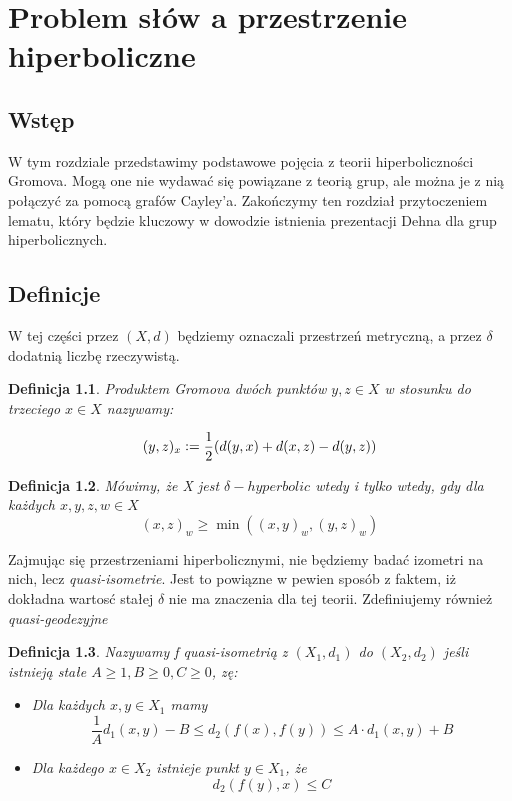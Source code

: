 \documentclass[licencjacka]{pracamgr}
\newcommand{\defeq}{\vcentcolon=}
\newtheorem{defi}{Definicja}[section]
\begin{document}
\chapter{Problem słów a przestrzenie hiperboliczne}\label{hyperbolicity}

\section{Wstęp}

W tym rozdziale przedstawimy podstawowe pojęcia z teorii hiperboliczności Gromova. Mogą one nie wydawać się powiązane z teorią grup, ale można je z nią połączyć za pomocą grafów Cayley'a. Zakończymy ten rozdział przytoczeniem lematu, który będzie kluczowy w dowodzie istnienia prezentacji Dehna dla grup hiperbolicznych.

\section{Definicje}

W tej części przez $(X, d)$ będziemy oznaczali przestrzeń metryczną, a przez $\delta$ dodatnią liczbę rzeczywistą.

\begin{defi}\label{Gromov product}
Produktem Gromova dwóch punktów $y, z \in X$ w stosunku do trzeciego $x \in X$ nazywamy:

\[ (y,z)_{x} \defeq \frac{1}{2} (d(y, x) + d(x, z) - d(y, z)) \]
\end{defi}

\begin{defi}\label{Hyperbolic space}
Mówimy, że X jest $\delta-hyperbolic$ wtedy i tylko wtedy, gdy dla każdych $x, y, z, w \in X$
\[ (x,z)_{w} \geq \min((x,y)_{w}, (y, z)_{w}) \]
\end{defi}

Zajmując się przestrzeniami hiperbolicznymi, nie będziemy badać izometri na nich, lecz \textit{quasi-isometrie}. Jest to powiązne w pewien sposób z faktem, iż dokładna wartosć stałej $\delta$ nie ma znaczenia dla tej teorii. Zdefiniujemy również \textit{quasi-geodezyjne}

\begin{defi}\label{Quasi-isometries}
Nazywamy f \emph{quasi-isometrią} z $(X_{1}, d_{1})$ do $(X_{2}, d_{2})$ jeśli istnieją stałe $A \geq 1, B \geq 0, C \geq 0$, zę:

\begin{itemize}
\item Dla każdych $x, y \in X_{1}$ mamy
\[ \frac{1}{A} d_{1}(x, y) - B \leq d_{2}(f(x), f(y)) \leq A \cdot d_{1}(x, y) + B \]
\item Dla każdego $x \in X_{2}$ istnieje punkt $y \in X_{1}$, że
\[ d_{2}(f(y), x) \leq C \]

\end{itemize}
\end{defi}
\end{document}
